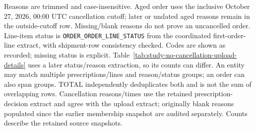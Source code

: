 \begin{landscape}
\begin{table}[!htbp]
\begin{minipage}{\linewidth}
Reasons are trimmed and case-insensitive. Aged order uses the inclusive
October 27, 2026, 00:00 UTC cancellation cutoff; later or undated aged reasons
remain in the outside-cutoff row. Missing/blank reasons do not prove an uncancelled
order. Line-item status is \texttt{ORDER\_ORDER\_LINE\_STATUS} from the coordinated first-order-line extract, with shipment-row consistency checked.
Codes are shown as recorded; missing status is explicit. Table~\ref{tab:study-no-cancellation-upload-details}
uses a later status/reason extraction, so its counts can differ.
An entity may match multiple prescriptions/lines and reason/status groups;
an order can also span groups. TOTAL independently deduplicates both and is not
the sum of overlapping rows. Cancellation reasons/times use the retained
prescription-decision extract and agree with the upload extract; originally blank
reasons populated since the earlier membership snapshot are audited separately.
Counts describe the retained source snapshots.
\end{minipage}
\end{table}
\end{landscape}

\clearpage
